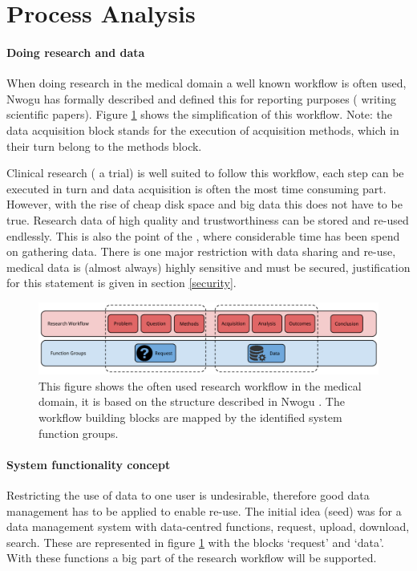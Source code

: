 \section{Process Analysis}
\label{process-analysis}

\paragraph{Doing research and \project{} data}
When doing research in the medical domain a well known workflow is often used, Nwogu \cite{nwogu} has formally described and defined this for reporting purposes (\ie{} writing scientific papers).
Figure \ref{fig:research-workflow} shows the simplification of this workflow.
Note: the data acquisition block stands for the execution of acquisition methods, which in their turn belong to the methods block.

Clinical research (\eg{} a trial) is well suited to follow this workflow, each step can be executed in turn and data acquisition is often the most time consuming part.
However, with the rise of cheap disk space and big data this does not have to be true.
Research data of high quality and trustworthiness can be stored and re-used endlessly.
This is also the point of the \project{}, where considerable time has been spend on gathering data.
There is one major restriction with data sharing and re-use, medical data is (almost always) highly sensitive and must be secured, justification for this statement is given in section \ref{security}.

\begin{figure}[hb]
	\centering
	\includegraphics[width=1.0\linewidth]{images/research-workflow}
	\caption{
		This figure shows the often used research workflow in the medical domain, it is based on the structure described in Nwogu \cite{nwogu}.
		The workflow building blocks are mapped by the identified system function groups.
	}
	\label{fig:research-workflow}
\end{figure}

\paragraph{System functionality concept}
Restricting the use of data to one user is undesirable, therefore good data management has to be applied to enable re-use.
The initial idea (seed) was for a data management system with data-centred functions, \eg{} request, upload, download, search.
These are represented in figure \ref{fig:research-workflow} with the blocks `request' and `data'.
With these functions a big part of the research workflow will be supported.

